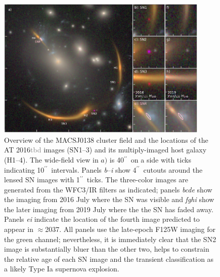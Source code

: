 \documentclass[12pt,dvipsnames]{article}
\gdef\arcsec{$^{\prime\prime}$}
\def\SNABC{AT 2016{\textcolor{Gray}{tbd}}\xspace}
\begin{document}

\clearpage
\begin{figure}
    \centering
    \includegraphics[draft=False,width=0.9\textwidth]{Paper/Figures/fig1_layout_sn4.pdf}
    \caption{Overview of the MACSJ0138 cluster field and the locations of the \SNABC images  (SN1--3) and its multiply-imaged host galaxy (H1--4). The wide-field view in $a)$ is 40\arcsec\ on a side with ticks indicating 10\arcsec\ intervals.  
    Panels \emph{b}--\emph{i} show 4\arcsec\ cutouts around the lensed SN images with 1\arcsec\ ticks.  The three-color images are generated from the WFC3/IR filters as indicated; panels \emph{bcde} show the imaging from 2016 July where the SN was visible and \emph{fghi} show the later imaging from 2019 July where the the SN has faded away.  Panels \emph{ei} indicate the location of the fourth image predicted to appear in $\approx$2037. All panels use the late-epoch F125W imaging for the green channel; nevertheless, it is immediately clear that the SN2 image is substantially bluer than the other two, helps to constrain the relative age of each SN image and the transient classification as a likely Type Ia supernova explosion.}
    
    \label{fig:layout}
\end{figure}
\end{document}
